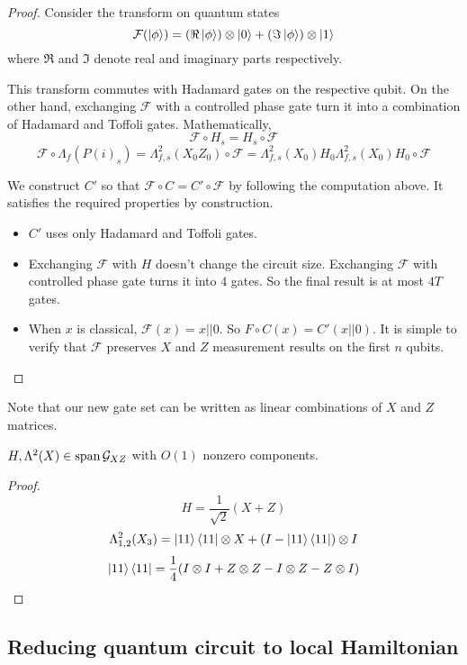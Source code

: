 \begin{proof}
	Consider the transform on quantum states
	$$\mathcal{F}(\ket{\phi})=(\Re\ket{\phi})\otimes\ket{0}+(\Im\ket{\phi})\otimes\ket{1}$$
	where $\Re$ and $\Im$ denote real and imaginary parts respectively.

	This transform commutes with Hadamard gates on the respective qubit. On the other hand, exchanging $\mathcal{F}$ with a controlled phase gate turn it into a combination of Hadamard and Toffoli gates. Mathematically,
	$$\mathcal{F}\circ H_s=H_s\circ\mathcal{F}$$
	$$\mathcal{F}\circ\Lambda_f(P(i)_s)=\Lambda^2_{f,s}(X_0Z_0)\circ\mathcal{F}=\Lambda^2_{f,s}(X_0)H_0\Lambda^2_{f,s}(X_0)H_0\circ\mathcal{F}$$

	We construct $C'$ so that $\mathcal{F}\circ C=C'\circ\mathcal{F}$ by following the computation above. It satisfies the required properties by construction.
	\begin{itemize}
		\item $C'$ uses only Hadamard and Toffoli gates.
		\item Exchanging $\mathcal{F}$ with $H$ doesn't change the circuit size. Exchanging $\mathcal{F}$ with controlled phase gate turns it into $4$ gates. So the final result is at most $4T$ gates.
		\item When $x$ is classical, $\mathcal{F}(x)=x||0$. So $F\circ C(x)=C'(x||0)$. It is simple to verify that $\mathcal{F}$ preserves $X$ and $Z$ measurement results on the first $n$ qubits.
	\end{itemize}
\end{proof}

Note that our new gate set can be written as linear combinations of $X$ and $Z$ matrices.

\begin{thm}
	$H,\Lambda^2(X)\in\operatorname*{\operatorname{span}}\mathcal{G}_{XZ}$ with $O(1)$ nonzero components.
\end{thm}

\begin{proof}
	$$H=\frac{1}{\sqrt{2}}(X+Z)$$
	$$\Lambda^2_{1,2}(X_3)=\ket{11}\bra{11}\otimes X+(I-\ket{11}\bra{11})\otimes I$$
	$$\ket{11}\bra{11}=\frac{1}{4}(I\otimes I+Z\otimes Z-I\otimes Z-Z\otimes I)$$
\end{proof}

\subsection{Reducing quantum circuit to  local Hamiltonian }

